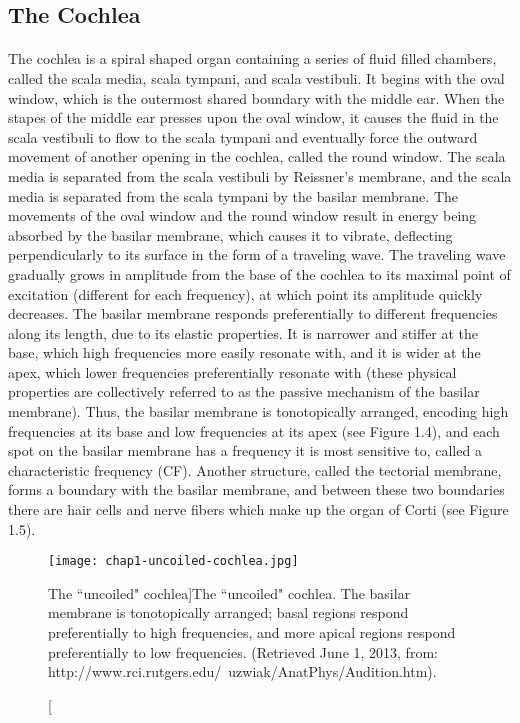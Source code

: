 \subsection{The Cochlea}
\paragraph{}The cochlea is a spiral shaped organ containing a series of fluid filled chambers, called the scala media, scala tympani, and scala vestibuli.  It begins with the oval window, which is the outermost shared boundary with the middle ear.  When the stapes of the middle ear presses upon the oval window, it causes the fluid in the scala vestibuli to flow to the scala tympani and eventually force the outward movement of another opening in the cochlea, called the round window.  The scala media is separated from the scala vestibuli by Reissner's membrane, and the scala media is separated from the scala tympani by the basilar membrane.  The movements of the oval window and the round window result in energy being absorbed by the basilar membrane, which causes it to vibrate, deflecting perpendicularly to its surface in the form of a traveling wave.  The traveling wave gradually grows in amplitude from the base of the cochlea to its maximal point of excitation (different for each frequency), at which point its amplitude quickly decreases.  The basilar membrane responds preferentially to different frequencies along its length, due to its elastic properties.  It is narrower and stiffer at the base, which high frequencies more easily resonate with, and it is wider at the apex, which lower frequencies preferentially resonate with (these physical properties are collectively referred to as the passive mechanism of the basilar membrane).  Thus, the basilar membrane is tonotopically arranged, encoding high frequencies at its base and low frequencies at its apex (see Figure 1.4), and each spot on the basilar membrane has a frequency it is most sensitive to, called a characteristic frequency (CF).  Another structure, called the tectorial membrane, forms a boundary with the basilar membrane, and between these two boundaries there are hair cells and nerve fibers which make up the organ of Corti (see Figure 1.5).

\begin{figure}[htbp]
\begin{center}
\texttt{[image: chap1-uncoiled-cochlea.jpg]} \\
\caption[The ``uncoiled" cochlea]{The ``uncoiled" cochlea.  The basilar membrane is tonotopically arranged; basal regions respond preferentially to high frequencies, and more apical regions respond preferentially to low frequencies.  (Retrieved June 1, 2013, from: http://www.rci.rutgers.edu/~uzwiak/AnatPhys/Audition.htm).}
\label{uncoiled-cochlea}
\end{center}
\end{figure}

